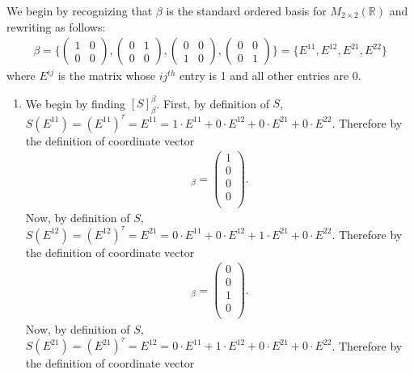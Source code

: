 \documentclass[12pt,answers]{exam}
\newcommand{\R}{\mathbb{R}}
\begin{document}
\begin{solution}
We begin by recognizing that $\beta$ is the standard ordered basis for $M_{2\times 2}(\R)$ and rewriting as follows:
\begin{align*}
    \beta = \biggl \{ \begin{pmatrix} 1 & 0 \\ 0 & 0 \end{pmatrix}, \begin{pmatrix} 0 & 1 \\ 0 & 0 \end{pmatrix}, \begin{pmatrix} 0 & 0 \\ 1 & 0 \end{pmatrix}, \begin{pmatrix} 0 & 0 \\ 0 & 1 \end{pmatrix} \biggr \}=\{E^{11},E^{12},E^{21},E^{22}\}
\end{align*}
where $E^{ij}$ is the matrix whose $ij^{th}$ entry is 1 and all other entries are 0. 
\begin{enumerate}[label=\roman*)]
\item We begin by finding $[S]^{\beta}_{\beta}$. First, by definition of $S$, $S(E^{11})=(E^{11})^{\tau}=E^{11}=1\cdot E^{11}+0\cdot E^{12}+0\cdot E^{21}+0\cdot E^{22}$. Therefore by the definition of coordinate vector
\begin{align*}
    [S(E^{11})]_{\beta}=\begin{pmatrix} 1 \\ 0 \\ 0 \\ 0 \\ \end{pmatrix}.
\end{align*}
Now, by definition of $S$, $S(E^{12})=(E^{12})^{\tau}=E^{21}=0\cdot E^{11}+0\cdot E^{12}+1\cdot E^{21}+0\cdot E^{22}$. Therefore by the definition of coordinate vector
\begin{align*}
    [S(E^{12})]_{\beta}=\begin{pmatrix} 0 \\ 0 \\ 1 \\ 0 \\ \end{pmatrix}.
\end{align*}
Now, by definition of $S$, $S(E^{21})=(E^{21})^{\tau}=E^{12}=0\cdot E^{11}+1\cdot E^{12}+0\cdot E^{21}+0\cdot E^{22}$. Therefore by the definition of coordinate vector

\end{enumerate}
\end{solution}
\end{document}
